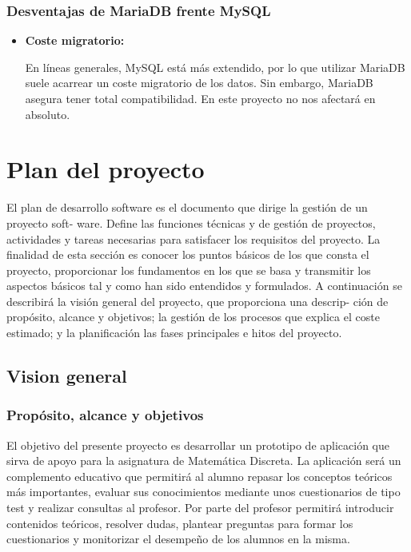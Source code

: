 \documentclass[openright,twoside,10pt]{book}
\begin{document}
    \subsection{Desventajas de MariaDB frente
    MySQL}\label{desventajas-de-mariadb-frente-mysql}
    
    \begin{itemize}
    \item
      \textbf{Coste migratorio:}
    
      En líneas generales, MySQL está más extendido, por lo que utilizar
      MariaDB suele acarrear un coste migratorio de los datos. Sin embargo,
      MariaDB asegura tener total compatibilidad. En este proyecto no nos
      afectará en absoluto.
    \end{itemize}
    
    \chapter{ Plan del proyecto }
    
    El plan de desarrollo software es el documento que dirige la gestión de
    un proyecto soft- ware. Define las funciones técnicas y de gestión de
    proyectos, actividades y tareas necesarias para satisfacer los
    requisitos del proyecto. La finalidad de esta sección es conocer los
    puntos básicos de los que consta el proyecto, proporcionar los
    fundamentos en los que se basa y transmitir los aspectos básicos tal y
    como han sido entendidos y formulados. A continuación se describirá la
    visión general del proyecto, que proporciona una descrip- ción de
    propósito, alcance y objetivos; la gestión de los procesos que explica
    el coste estimado; y la planificación las fases principales e hitos del
    proyecto.
    
    \section{Vision general}\label{vision-general}
    
    \subsection{Propósito, alcance y
    objetivos}\label{propuxf3sito-alcance-y-objetivos}
    
    El objetivo del presente proyecto es desarrollar un prototipo de
    aplicación que sirva de apoyo para la asignatura de Matemática Discreta.
    La aplicación será un complemento educativo que permitirá al alumno
    repasar los conceptos teóricos más importantes, evaluar sus
    conocimientos mediante unos cuestionarios de tipo test y realizar
    consultas al profesor. Por parte del profesor permitirá introducir
    contenidos teóricos, resolver dudas, plantear preguntas para formar los
    cuestionarios y monitorizar el desempeño de los alumnos en la misma.
    
\end{document}
